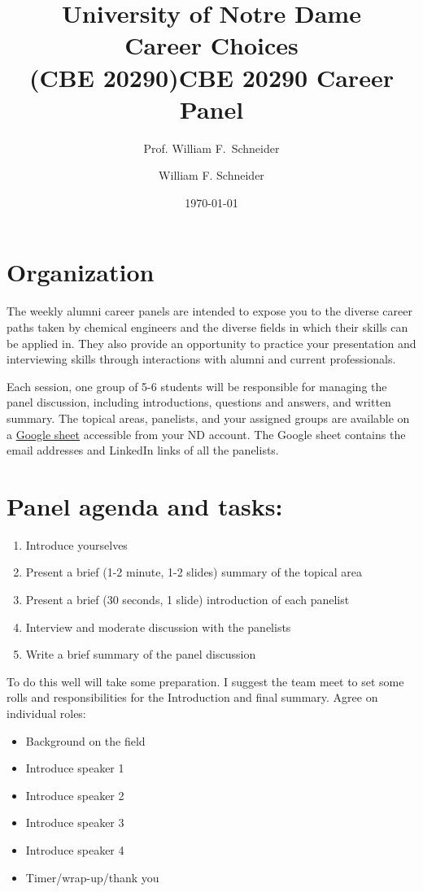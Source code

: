\documentclass[11pt]{article}
\title{University of Notre Dame\\Career Choices\\(CBE 20290)}
\author{Prof. William F.\ Schneider}
\author{William F. Schneider}
\date{\today}
\title{CBE 20290 Career Panel}
\begin{document}
\begin{OPTIONS}
\end{OPTIONS}

\section{Organization}
\label{sec:org5ab7e11}
The weekly alumni career panels are intended to expose you to the diverse career paths taken by chemical engineers and  the diverse fields in which their skills can be applied in. They also provide an opportunity to practice your presentation and interviewing skills through interactions with alumni and current professionals.

Each session, one group of 5-6 students will be responsible for managing the panel discussion, including introductions, questions and answers, and written summary. The topical areas, panelists, and your assigned groups  are available on a  \href{https://docs.google.com/spreadsheets/d/1IFn56\_q2D8sfBdZx9Idm4Pvy1nI8MEQJUamCiiHcFkE/edit?usp=sharing}{Google sheet} accessible from your ND account.  The Google sheet contains the email addresses and LinkedIn links of all the panelists.

\section{Panel agenda and tasks:}
\label{sec:org74a941a}
\begin{enumerate}
\item Introduce yourselves
\item Present a brief (1-2  minute, 1-2 slides) summary of the topical area
\item Present a brief (30 seconds, 1 slide) introduction of each panelist
\item Interview and moderate discussion with the panelists
\item Write a brief summary of the panel discussion
\end{enumerate}

To do this well will take some preparation. I suggest the team meet to set some rolls and responsibilities for the Introduction and final summary. Agree on individual roles:
\begin{itemize}
\item Background on the field
\item Introduce speaker 1
\item Introduce speaker 2
\item Introduce speaker 3
\item Introduce speaker 4
\item Timer/wrap-up/thank you
\end{itemize}
\end{document}
